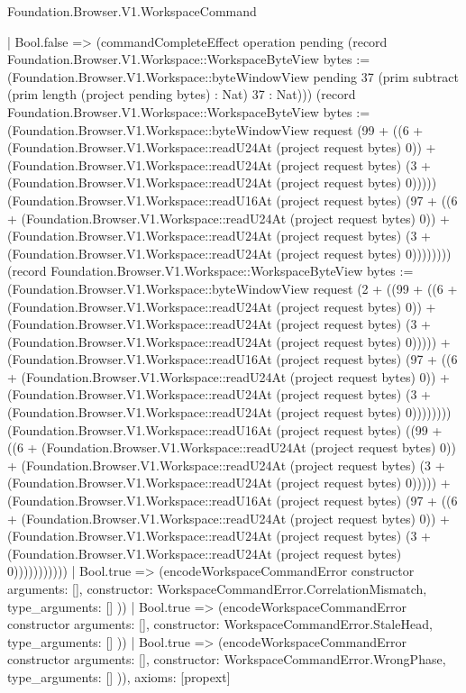 \begin{lexlean}{Foundation.Browser.V1.WorkspaceCommand}
\begin{semanticmodule}
{        | Bool.false => (commandCompleteEffect operation pending (record Foundation.Browser.V1.Workspace::WorkspaceByteView {bytes := (Foundation.Browser.V1.Workspace::byteWindowView pending 37 (prim subtract (prim length (project pending bytes) : Nat) 37 : Nat))}) (record Foundation.Browser.V1.Workspace::WorkspaceByteView {bytes := (Foundation.Browser.V1.Workspace::byteWindowView request (99 + ((6 + (Foundation.Browser.V1.Workspace::readU24At (project request bytes) 0)) + (Foundation.Browser.V1.Workspace::readU24At (project request bytes) (3 + (Foundation.Browser.V1.Workspace::readU24At (project request bytes) 0))))) (Foundation.Browser.V1.Workspace::readU16At (project request bytes) (97 + ((6 + (Foundation.Browser.V1.Workspace::readU24At (project request bytes) 0)) + (Foundation.Browser.V1.Workspace::readU24At (project request bytes) (3 + (Foundation.Browser.V1.Workspace::readU24At (project request bytes) 0)))))))}) (record Foundation.Browser.V1.Workspace::WorkspaceByteView {bytes := (Foundation.Browser.V1.Workspace::byteWindowView request (2 + ((99 + ((6 + (Foundation.Browser.V1.Workspace::readU24At (project request bytes) 0)) + (Foundation.Browser.V1.Workspace::readU24At (project request bytes) (3 + (Foundation.Browser.V1.Workspace::readU24At (project request bytes) 0))))) + (Foundation.Browser.V1.Workspace::readU16At (project request bytes) (97 + ((6 + (Foundation.Browser.V1.Workspace::readU24At (project request bytes) 0)) + (Foundation.Browser.V1.Workspace::readU24At (project request bytes) (3 + (Foundation.Browser.V1.Workspace::readU24At (project request bytes) 0)))))))) (Foundation.Browser.V1.Workspace::readU16At (project request bytes) ((99 + ((6 + (Foundation.Browser.V1.Workspace::readU24At (project request bytes) 0)) + (Foundation.Browser.V1.Workspace::readU24At (project request bytes) (3 + (Foundation.Browser.V1.Workspace::readU24At (project request bytes) 0))))) + (Foundation.Browser.V1.Workspace::readU16At (project request bytes) (97 + ((6 + (Foundation.Browser.V1.Workspace::readU24At (project request bytes) 0)) + (Foundation.Browser.V1.Workspace::readU24At (project request bytes) (3 + (Foundation.Browser.V1.Workspace::readU24At (project request bytes) 0)))))))))}))
        | Bool.true => (encodeWorkspaceCommandError constructor{
          arguments: [],
          constructor: WorkspaceCommandError.CorrelationMismatch,
          type_arguments: []
        }))
      | Bool.true => (encodeWorkspaceCommandError constructor{
        arguments: [],
        constructor: WorkspaceCommandError.StaleHead,
        type_arguments: []
      }))
    | Bool.true => (encodeWorkspaceCommandError constructor{
      arguments: [],
      constructor: WorkspaceCommandError.WrongPhase,
      type_arguments: []
    })),
  axioms: [propext]
}


\end{semanticmodule}
\end{lexlean}
